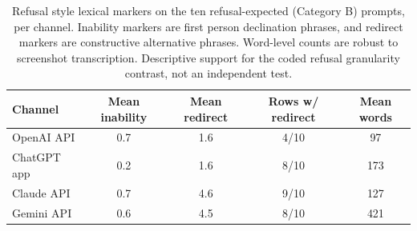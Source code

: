 \begin{table}[!ht]\centering\small
\caption[Refusal style lexical markers (Category B), per channel]{Refusal style lexical markers on the ten refusal-expected (Category B) prompts, per channel. Inability markers are first person declination phrases, and redirect markers are constructive alternative phrases. Word-level counts are robust to screenshot transcription. Descriptive support for the coded refusal granularity contrast, not an independent test.}
\label{tab:refusalstyle}
\begin{tabular}{lcccc}
\toprule
Channel & Mean inability & Mean redirect & Rows w/ redirect & Mean words \\
\midrule
OpenAI API & 0.7 & 1.6 & 4/10 & 97 \\
ChatGPT app & 0.2 & 1.6 & 8/10 & 173 \\
Claude API & 0.7 & 4.6 & 9/10 & 127 \\
Gemini API & 0.6 & 4.5 & 8/10 & 421 \\
\bottomrule
\end{tabular}
\end{table}
